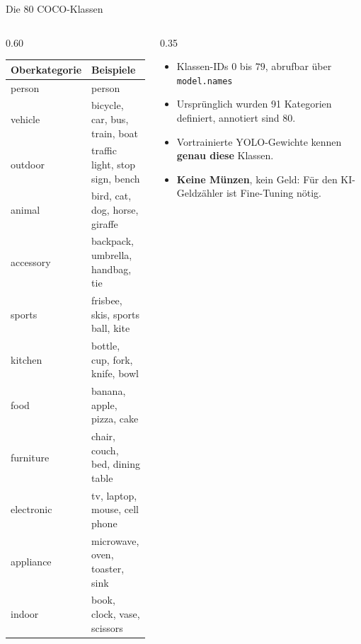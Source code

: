 \begin{frame}{Die 80 COCO-Klassen}
\footnotesize
\begin{columns}
\begin{column}{0.60\textwidth}
\centering
\begin{tabular}{ll}
\toprule
\textbf{Oberkategorie} & \textbf{Beispiele} \\
\midrule
person & person \\
vehicle & bicycle, car, bus, train, boat \\
outdoor & traffic light, stop sign, bench \\
animal & bird, cat, dog, horse, giraffe \\
accessory & backpack, umbrella, handbag, tie \\
sports & frisbee, skis, sports ball, kite \\
kitchen & bottle, cup, fork, knife, bowl \\
food & banana, apple, pizza, cake \\
furniture & chair, couch, bed, dining table \\
electronic & tv, laptop, mouse, cell phone \\
appliance & microwave, oven, toaster, sink \\
indoor & book, clock, vase, scissors \\
\bottomrule
\end{tabular}
\end{column}
\begin{column}{0.35\textwidth}
\begin{itemize}
  \item Klassen-IDs $0$ bis $79$, abrufbar über \texttt{model.names}
  \item Ursprünglich wurden 91 Kategorien definiert, annotiert sind 80.
  \item Vortrainierte YOLO-Gewichte kennen \textbf{genau diese} Klassen.
  \item \textbf{Keine Münzen}, kein Geld: Für den KI-Geldzähler ist Fine-Tuning nötig.
\end{itemize}
\end{column}
\end{columns}
\end{frame}

